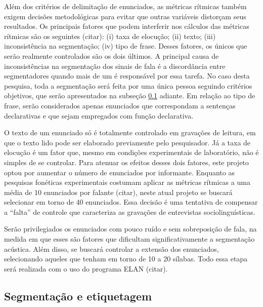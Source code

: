 \documentclass[
	a4paper,	%
	12pt,		%
	]{article}	%
\begin{document}
Além dos critérios de delimitação de enunciados, as métricas rítmicas também
exigem decisões metodológicas para evitar que outras variáveis distorçam
seus resultados. Os principais fatores que podem interferir nos cálculos das
métricas rítmicas são os seguintes (citar): (i) taxa de elocução; (ii)
texto; (iii)  inconsistência na segmentação; (iv) tipo de frase. Desses
fatores, os únicos que serão realmente controlados são os dois últimos. A
principal causa de inconsistências na segmentação dos sinais de fala é a
discordância entre segmentadores quando mais de um é responsável por essa
tarefa. No caso desta pesquisa, toda a segmentação será feita por uma única
pessoa seguindo critérios objetivos, que serão apresentados na subseção
\ref{segm} adiante. Em relação ao tipo de frase, serão considerados apenas
enunciados que correspondam a sentenças declarativas e que sejam empregados
com função declarativa.

O texto de um enunciado só é totalmente controlado em gravações de leitura,
em que o texto lido pode ser elaborado previamente pelo pesquisador. Já a
taxa de elocução é um fator que, mesmo em condições experimentais de
laboratório, não é simples de se controlar. Para atenuar os efeitos desses
dois fatores, este projeto optou por aumentar o número de
enunciados por informante. Enquanto as pesquisas fonéticas experimentais
costumam aplicar as métricas rítmicas a uma média de 10 enunciados por
falante (citar), neste atual projeto se buscará selecionar em torno de 40
enunciados. Essa decisão é uma tentativa de compensar a \enquote{falta} de
controle que caracteriza as gravações de entrevistas sociolinguísticas.

Serão privilegiados os enunciados com pouco ruído e sem sobreposição de
fala, na medida em que esses são fatores que dificultam significativamente a
segmentação acústica. Além disso, se buscará controlar a extensão dos
enunciados, selecionando aqueles que tenham em torno de 10 a 20 sílabas.
Todo essa etapa será realizada com o uso do programa ELAN (citar).
	
\subsection{Segmentação e etiquetagem} \label{segm}
\end{document}
